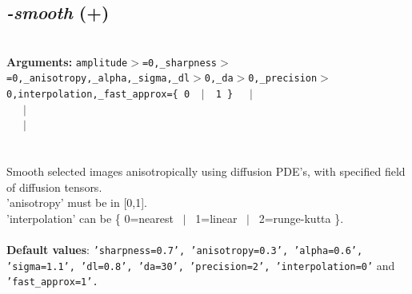 \documentclass[a4paper,11pt,twoside]{book}
\begin{document}
\subsection{\emph{-smooth} (+)}\vspace*{-0.5em}
~\\\textbf{Arguments: } 
{\small \texttt{amplitude$>$=0,\_sharpness$>$=0,\_anisotropy,\_alpha,\_sigma,\_dl$>$0,\_da$>$0,\_precision$>$0,interpolation,\_fast\_approx=\{ 0 ~$|$~ 1 \}}}~~~$|$\\
~~~$|$\\
~~~$|$\\
\\~\\
Smooth selected images anisotropically using diffusion PDE's, with specified field of
diffusion tensors.
~\\'anisotropy' must be in [0,1].
~\\'interpolation' can be \{ 0=nearest ~$|$~ 1=linear ~$|$~ 2=runge-kutta \}.
~\\~\\\textbf{Default values}: {\small \texttt{'sharpness=0.7', 'anisotropy=0.3', 'alpha=0.6', 'sigma=1.1', 'dl=0.8', 'da=30', 'precision=2', 'interpolation=0'} and \texttt{'fast\_approx=1'.}}
\end{document}
